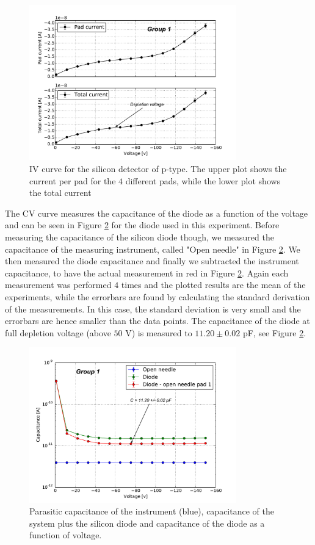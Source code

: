 \documentclass[12pt]{article}
\begin{document}
\begin{figure}[h!]
  \centering
  \includegraphics[width=0.8\textwidth]{./graphics/IV_V_vs_A.pdf}
  \caption{IV curve for the silicon detector of p-type. The upper plot shows the current per pad for the $4$ different pads, while the lower plot shows the total current }
  \label{fig:IVcurve}
\end{figure}

The CV curve measures the capacitance of the diode as a function of the voltage and can be seen in Figure \ref{fig:VC_curve_single} for the diode used in this experiment. Before measuring the capacitance of the silicon diode though, we measured the capacitance of the measuring instrument, called "Open needle" in Figure \ref{fig:VC_curve_single}. We then measured the diode capacitance and finally we subtracted the instrument capacitance, to have the actual measurement in red in Figure \ref{fig:VC_curve_single}. Again each measurement was performed $4$ times and the plotted results are the mean of the experiments, while the errorbars are found by calculating the standard derivation of the measurements. In this case, the standard deviation is very small and the errorbars are hence smaller than the data points. The capacitance of the diode at full depletion voltage (above $50$ V) is measured to $11.20 \pm 0.02$ pF, see Figure \ref{fig:VC_curve_single}.

\begin{figure}[t!]
  \centering
  \includegraphics[width=0.8\textwidth]{./graphics/V_vs_C}
  \caption{Parasitic capacitance of the instrument (blue), capacitance of the system plus the silicon diode and capacitance of the diode as a function of voltage.}
  \label{fig:VC_curve_single}
\end{figure}
\end{document}
